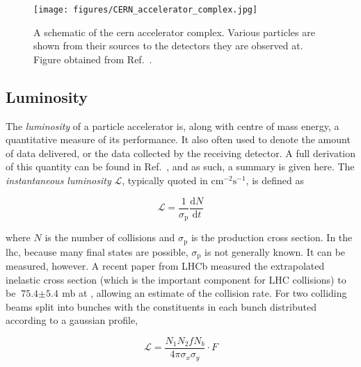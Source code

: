 \begin{figure}[htbp]
    \centering
    \texttt{[image: figures/CERN\_accelerator\_complex.jpg]}
    \caption[A schematic of the \acrshort{cern} accelerator complex]{A schematic of the \acrshort{cern} accelerator complex. Various particles are shown from their sources to the detectors they are observed at. Figure obtained from Ref.~.}
    \label{fig:cern_accelerator_complex}
\end{figure}





\subsection{Luminosity}
\label{subsec:luminosity}

The \emph{\gls{luminosity}} of a particle accelerator is, along with centre of mass energy, a quantitative measure of its performance. It also often used to denote the amount of data delivered, or the data collected by the receiving detector. A full derivation of this quantity can be found in Ref.~, and as such, a summary is given here. The \emph{instantaneous luminosity} $\mathcal{L}$, typically quoted in $\text{cm}^{-2}\text{s}^{-1}$, is defined as

\begin{equation}
    \mathcal{L} = \frac{1}{\sigma_{\mathrm{p}}} \frac{\mathrm{d}N}{\mathrm{d}t}
    \label{eq:lumi_instantaneous}
\end{equation}

where $N$ is the number of collisions and $\sigma_{\mathrm{p}}$ is the production cross section. In the \acrshort{lhc}, because many final states are possible, $\sigma_{\mathrm{p}}$ is not generally known. It can be measured, however. A recent paper from LHCb measured the extrapolated inelastic cross section (which is the important component for LHC collisions) to be $\text{75.4}\pm\text{5.4}$\,mb at \comruntwo \cite{Aaij:2018okq}, allowing an estimate of the collision rate. For two colliding beams split into bunches with the constituents in each bunch distributed according to a gaussian profile,

\begin{equation}
    \mathcal{L} = \frac{N_1 N_2 f N_b}{4 \pi \sigma_x \sigma_y} \cdot F %
    \label{eq:lumi_inst_head_on_colliding_beams}
\end{equation}

